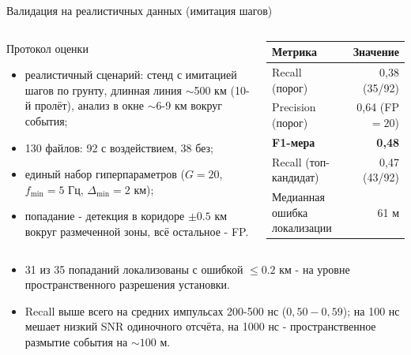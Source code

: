 \documentclass[aspectratio=169,11pt]{beamer}
\begin{document}
\begin{frame}[t]{Валидация на реалистичных данных (имитация шагов)}
    \footnotesize
    \begin{columns}[T,onlytextwidth]
        \begin{block}{Протокол оценки}
            \scriptsize
            \begin{itemize}
                \item реалистичный сценарий: стенд с имитацией шагов по грунту, длинная линия $\sim$500 км (10-й пролёт), анализ в окне $\sim$6-9 км вокруг события;
                \item 130 файлов: 92 с воздействием, 38 без;
                \item единый набор гиперпараметров ($G=20$, $f_\text{min}=5$ Гц, $\Delta_\text{min}=2$ км);
                \item попадание - детекция в коридоре $\pm 0.5$ км вокруг размеченной зоны, всё остальное - FP.
            \end{itemize}
        \end{block}

        \vspace{0.5ex}
        \renewcommand{\arraystretch}{1.3}
        \begin{tabular}{@{}l r@{}}
            \toprule
            \textbf{Метрика} & \textbf{Значение} \\
            \midrule
            Recall (порог) & 0{,}38 \;(35/92) \\
            Precision (порог) & 0{,}64 \;(FP $=20$) \\
            \textbf{F1-мера} & \textbf{0{,}48} \\
            Recall (топ-кандидат) & 0{,}47 \;(43/92) \\
            Медианная ошибка локализации & 61 м \\
            \bottomrule
        \end{tabular}
    \end{columns}

    \vspace{1.0ex}
    \scriptsize
    \begin{itemize}
        \item 31 из 35 попаданий локализованы с ошибкой $\le 0.2$ км - на уровне пространственного разрешения установки.
        \item Recall выше всего на средних импульсах 200-500 нс ($0{,}50-0{,}59$); на 100 нс мешает низкий SNR одиночного отсчёта, на 1000 нс - пространственное размытие события на ${\sim}100$ м.
    \end{itemize}
\end{frame}
\end{document}
